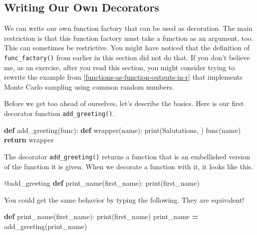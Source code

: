 \documentclass[
  12pt,
  krantz2]{krantz}
\makeatletter
\newenvironment{Shaded}{\begin{snugshade}}{\end{snugshade}}
\newcommand{\AttributeTok}[1]{\textcolor[rgb]{0.61,0.61,0.61}{#1}}
\newcommand{\BuiltInTok}[1]{#1}
\newcommand{\ControlFlowTok}[1]{\textcolor[rgb]{0.27,0.27,0.27}{\textbf{#1}}}
\newcommand{\KeywordTok}[1]{\textcolor[rgb]{0.27,0.27,0.27}{\textbf{#1}}}
\newcommand{\NormalTok}[1]{#1}
\newcommand{\OperatorTok}[1]{\textcolor[rgb]{0.43,0.43,0.43}{\textbf{#1}}}
\newcommand{\StringTok}[1]{\textcolor[rgb]{0.5,0.5,0.5}{#1}}
\newenvironment{kframe}{%
\medskip{}
\setlength{\fboxsep}{.8em}
 \def\at@end@of@kframe{}%
 \ifinner\ifhmode%
  \def\at@end@of@kframe{\end{minipage}}%
  \begin{minipage}{\columnwidth}%
 \fi\fi%
 \def\FrameCommand##1{\hskip\@totalleftmargin \hskip-\fboxsep
 \colorbox{shadecolor}{##1}\hskip-\fboxsep
     \hskip-\linewidth \hskip-\@totalleftmargin \hskip\columnwidth}%
 \MakeFramed {\advance\hsize-\width
   \@totalleftmargin\z@ \linewidth\hsize
   \@setminipage}}%
 {\par\unskip\endMakeFramed%
 \at@end@of@kframe}
\renewenvironment{Shaded}{\begin{kframe}}{\end{kframe}}
\makeatother
\begin{document}
\hypertarget{writing-our-own-decorators}{%
\subsection{Writing Our Own Decorators}\label{writing-our-own-decorators}}

We can write our own function factory that can be used as decoration. The main restriction is that this function factory must take a function as an argument, too. This can sometimes be restrictive. You might have noticed that the definition of \texttt{func\_factory()} from earlier in this section did not do that. If you don't believe me, as an exercise, after you read this section, you might consider trying to rewrite the example from \ref{functions-as-function-outputs-in-r} that implements Monte Carlo sampling using common random numbers.

Before we get too ahead of ourselves, let's describe the basics. Here is our first decorator function \texttt{add\_greeting()}.

\begin{Shaded}
\begin{Highlighting}[]
\KeywordTok{def}\NormalTok{ add\_greeting(func):}
    \KeywordTok{def}\NormalTok{ wrapper(name):}
        \BuiltInTok{print}\NormalTok{(}\StringTok{\textquotesingle{}Salutations, \textquotesingle{}}\NormalTok{)}
\NormalTok{        func(name)}
    \ControlFlowTok{return}\NormalTok{ wrapper}
\end{Highlighting}
\end{Shaded}

The decorator \texttt{add\_greeting()} returns a function that is an embellished version of the function it is given. When we decorate a function with it, it looks like this.

\begin{Shaded}
\begin{Highlighting}[]
\AttributeTok{@add\_greeting}
\KeywordTok{def}\NormalTok{ print\_name(first\_name):}
    \BuiltInTok{print}\NormalTok{(first\_name)}
\end{Highlighting}
\end{Shaded}

You could get the same behavior by typing the following. They are equivalent!

\begin{Shaded}
\begin{Highlighting}[]
\KeywordTok{def}\NormalTok{ print\_name(first\_name):}
    \BuiltInTok{print}\NormalTok{(first\_name)}
\NormalTok{print\_name }\OperatorTok{=}\NormalTok{ add\_greeting(print\_name)}
\end{Highlighting}
\end{Shaded}
\end{document}
